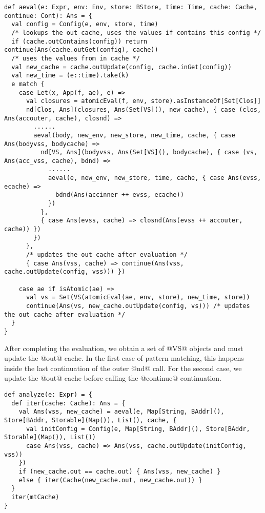 \documentclass[acmsmall,review,anonymous]{acmart}\settopmatter{printfolios=true,printccs=false,printacmref=false}
\begin{document}
\begin{lstlisting}
def aeval(e: Expr, env: Env, store: BStore, time: Time, cache: Cache, continue: Cont): Ans = {
  val config = Config(e, env, store, time)
  /* lookups the out cache, uses the values if contains this config */
  if (cache.outContains(config)) return continue(Ans(cache.outGet(config), cache))
  /* uses the values from in cache */
  val new_cache = cache.outUpdate(config, cache.inGet(config))
  val new_time = (e::time).take(k)
  e match {
    case Let(x, App(f, ae), e) =>
      val closures = atomicEval(f, env, store).asInstanceOf[Set[Clos]]
      nd[Clos, Ans](closures, Ans(Set[VS](), new_cache), { case (clos, Ans(accouter, cache), closnd) =>
        ......
        aeval(body, new_env, new_store, new_time, cache, { case Ans(bodyvss, bodycache) =>
          nd[VS, Ans](bodyvss, Ans(Set[VS](), bodycache), { case (vs, Ans(acc_vss, cache), bdnd) =>
            ......
            aeval(e, new_env, new_store, time, cache, { case Ans(evss, ecache) =>
              bdnd(Ans(accinner ++ evss, ecache))
            })
          },
          { case Ans(evss, cache) => closnd(Ans(evss ++ accouter, cache)) })
        })
      },
      /* updates the out cache after evaluation */
      { case Ans(vss, cache) => continue(Ans(vss, cache.outUpdate(config, vss))) })

    case ae if isAtomic(ae) =>
      val vs = Set(VS(atomicEval(ae, env, store), new_time, store))
      continue(Ans(vs, new_cache.outUpdate(config, vs))) /* updates the out cache after evaluation */
  }
}
\end{lstlisting}

After completing the evaluation, we obtain a set of @VS@ objects and must update the @out@ cache.
In the first case of pattern matching, this happens inside the last continuation of the
outer @nd@ call.
For the second case, we update the @out@ cache before calling the @continue@ continuation.

\begin{lstlisting}
def analyze(e: Expr) = {
  def iter(cache: Cache): Ans = {
    val Ans(vss, new_cache) = aeval(e, Map[String, BAddr](), Store[BAddr, Storable](Map()), List(), cache, {
      val initConfig = Config(e, Map[String, BAddr](), Store[BAddr, Storable](Map()), List())
      case Ans(vss, cache) => Ans(vss, cache.outUpdate(initConfig, vss))
    })
    if (new_cache.out == cache.out) { Ans(vss, new_cache) }
    else { iter(Cache(new_cache.out, new_cache.out)) }
  }
  iter(mtCache)
}
\end{lstlisting}
\end{document}
